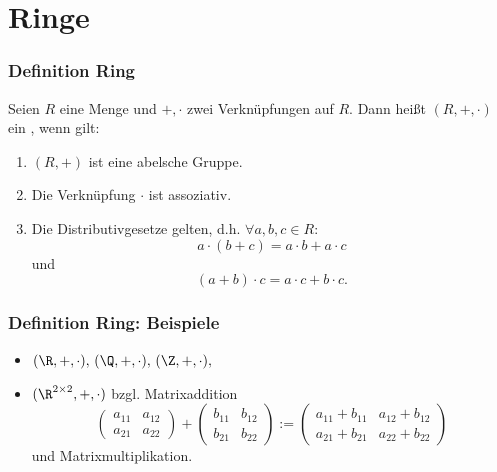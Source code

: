 \section{Ringe}
%
\begin{frame}\frametitle{Definition Ring}
	
	Seien $R$ eine Menge und $+, \cdot$ zwei Verkn\"upfungen auf $R$. 
	Dann hei{\ss}t $(R,+,\cdot)$ ein , wenn gilt:
	\begin{enumerate}
		\item $(R,+)$ ist eine abelsche Gruppe.
		\item Die Verkn\"upfung $\cdot$ ist assoziativ.
		\item Die Distributivgesetze gelten, d.h. $\forall a,b,c \in R$:
			$$
				a\cdot (b+c) = a\cdot b + a\cdot c
			$$
			und
			$$
		 		(a+b)\cdot c = a\cdot c + b\cdot c.
			$$
	\end{enumerate}
	
\end{frame}
%
%
\begin{frame}\frametitle{Definition Ring: Beispiele}
	
	\begin{itemize}
		\item $(\R,+,\cdot),\, (\Q,+,\cdot),\, (\Z,+,\cdot),$ \pause
		\item $(\R^{2\times 2}, +, \cdot)$ bzgl. Matrixaddition 
			$$
				\begin{pmatrix}
					a_{11}	&	a_{12}	\\
					a_{21}	&	a_{22}
				\end{pmatrix}
				+
				\begin{pmatrix}
					b_{11}	&	b_{12}	\\
					b_{21}	&	b_{22}
				\end{pmatrix}
				:=
				\begin{pmatrix}
					a_{11} + b_{11}	&	a_{12} + b_{12}	\\
					a_{21} +b_{21}	&	a_{22} + b_{22}
				\end{pmatrix}
			$$
			und Matrixmultiplikation.
	\end{itemize}
	
\end{frame}
%
